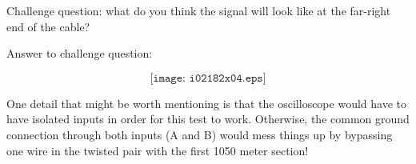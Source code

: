 \vskip 10pt

Challenge question: what do you think the signal will look like at the far-right end of the cable?







Answer to challenge question:

$$\texttt{[image: i02182x04.eps]}$$

\vskip 10pt

One detail that might be worth mentioning is that the oscilloscope would have to have isolated inputs in order for this test to work.  Otherwise, the common ground connection through both inputs (A and B) would mess things up by bypassing one wire in the twisted pair with the first 1050 meter section!





